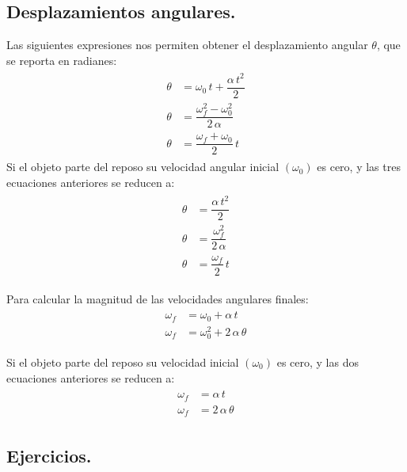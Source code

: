 \documentclass[12pt]{article}
\begin{document}
\subsection{Desplazamientos angulares.}

Las siguientes expresiones nos permiten obtener el desplazamiento angular $\theta$, que se reporta en radianes:
\begin{eqnarray*}
\begin{aligned}
\theta &= \omega_{0} \, t + \dfrac{\alpha \, t^{2}}{2} \\[0.5em] 
\theta &= \dfrac{\omega_{f}^{2} - \omega_{0}^{2}}{2 \, \alpha} \\[0.5em] 
\theta &= \dfrac{\omega_{f} + \omega_{0}}{2} \, t
\end{aligned}
\end{eqnarray*}
Si el objeto parte del reposo su velocidad angular inicial $(\omega_{0})$ es cero, y las tres ecuaciones anteriores se reducen a:
\begin{eqnarray*}
\begin{aligned}
\theta &= \dfrac{\alpha \, t^{2}}{2} \\[0.5em] 
\theta &= \dfrac{\omega_{f}^{2}}{2 \, \alpha} \\[0.5em] 
\theta &= \dfrac{\omega_{f}}{2} \, t
\end{aligned}
\end{eqnarray*}

Para calcular la magnitud de las velocidades angulares finales:
\begin{eqnarray*}
\begin{aligned}
\omega_{f} &= \omega_{0} + \alpha \, t \\[0.5em] 
\omega_{f} &= \omega_{0}^{2} + 2 \, \alpha \, \theta
\end{aligned}
\end{eqnarray*}

Si el objeto parte del reposo su velocidad inicial $(\omega_{0})$ es cero, y las dos ecuaciones anteriores se reducen a:
\begin{eqnarray*}
\begin{aligned}
\omega_{f} &= \alpha \, t \\[0.5em] 
\omega_{f} &= 2 \, \alpha \, \theta
\end{aligned}
\end{eqnarray*}

\subsection{Ejercicios.}
\end{document}
